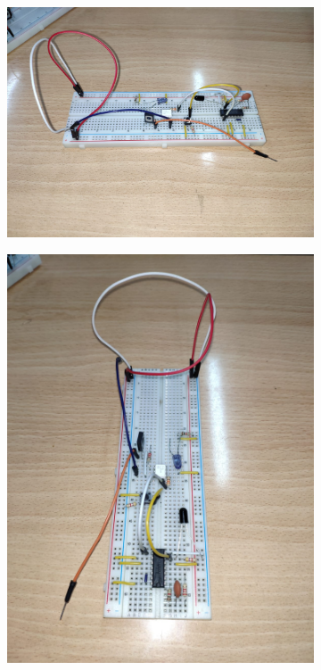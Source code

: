 \begin{figure}[htb]
    \centering
    \begin{subfigure}[htb]{0.45\textwidth}
        \centering
        \includegraphics[width=\textwidth]{media/circuito_real_1_08}
        \caption{}
    \end{subfigure}
    \centering
    \begin{subfigure}[htb]{0.45\textwidth}
        \centering
        \includegraphics[width=\textwidth]{media/circuito_real_2_08}

\end{subfigure}
\end{figure}
